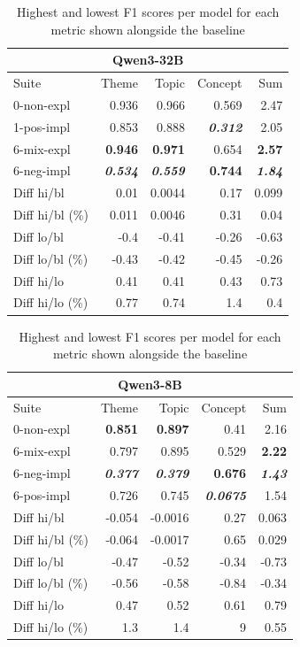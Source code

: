\begin{table}
    \begin{tabular}{lrrrr}
    \toprule
    \multicolumn{5}{c}{\textbf{Qwen3-32B}} \\
    \midrule
    Suite & Theme & Topic & Concept & Sum \\
    \midrule
    0-non-expl & 0.936 & 0.966 & 0.569 & 2.47 \\
    1-pos-impl & 0.853 & 0.888 & \bfseries \itshape 0.312 & 2.05 \\
    6-mix-expl & \bfseries 0.946 & \bfseries 0.971 & 0.654 & \bfseries 2.57 \\
    6-neg-impl & \bfseries \itshape 0.534 & \bfseries \itshape 0.559 & \bfseries 0.744 & \bfseries \itshape 1.84 \\
    \midrule
    Diff hi/bl & 0.01 & 0.0044 & 0.17 & 0.099 \\
    Diff hi/bl (\%) & 0.011 & 0.0046 & 0.31 & 0.04 \\
    Diff lo/bl & -0.4 & -0.41 & -0.26 & -0.63 \\
    Diff lo/bl (\%) & -0.43 & -0.42 & -0.45 & -0.26 \\
    Diff hi/lo & 0.41 & 0.41 & 0.43 & 0.73 \\
    Diff hi/lo (\%) & 0.77 & 0.74 & 1.4 & 0.4 \\
    \bottomrule
    \end{tabular}
    \begin{tabular}{lrrrr}
    \toprule
    \multicolumn{5}{c}{\textbf{Qwen3-8B}} \\
    \midrule
    Suite & Theme & Topic & Concept & Sum \\
    \midrule
    0-non-expl & \bfseries 0.851 & \bfseries 0.897 & 0.41 & 2.16 \\
    6-mix-expl & 0.797 & 0.895 & 0.529 & \bfseries 2.22 \\
    6-neg-impl & \bfseries \itshape 0.377 & \bfseries \itshape 0.379 & \bfseries 0.676 & \bfseries \itshape 1.43 \\
    6-pos-impl & 0.726 & 0.745 & \bfseries \itshape 0.0675 & 1.54 \\
    \midrule
    Diff hi/bl & -0.054 & -0.0016 & 0.27 & 0.063 \\
    Diff hi/bl (\%) & -0.064 & -0.0017 & 0.65 & 0.029 \\
    Diff lo/bl & -0.47 & -0.52 & -0.34 & -0.73 \\
    Diff lo/bl (\%) & -0.56 & -0.58 & -0.84 & -0.34 \\
    Diff hi/lo & 0.47 & 0.52 & 0.61 & 0.79 \\
    Diff hi/lo (\%) & 1.3 & 1.4 & 9 & 0.55 \\
    \bottomrule
    \end{tabular}
    \caption{Highest and lowest F1 scores per model for each metric shown alongside the baseline}
    \label{tab:baselines_compared}
\end{table}